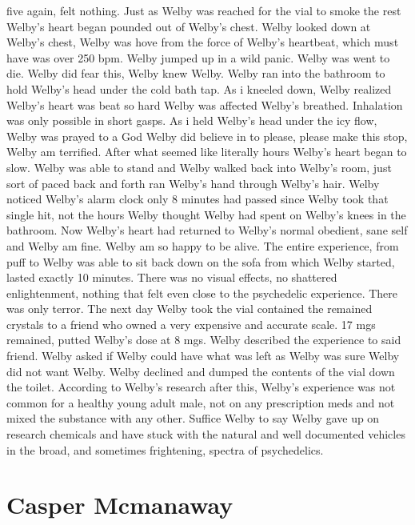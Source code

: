 \documentclass[12pt]{book}
\begin{document}
five again, felt nothing. Just as Welby was reached for the vial to smoke the rest Welby's heart began pounded out of Welby's chest. Welby looked down at Welby's chest, Welby was hove from the force of Welby's heartbeat, which must have was over 250 bpm. Welby jumped up in a wild panic. Welby was went to die. Welby did fear this, Welby knew Welby. Welby ran into the bathroom to hold Welby's head under the cold bath tap. As i kneeled down, Welby realized Welby's heart was beat so hard Welby was affected Welby's breathed. Inhalation was only possible in short gasps. As i held Welby's head under the icy flow, Welby was prayed to a God Welby did believe in to please, please make this stop, Welby am terrified. After what seemed like literally hours Welby's heart began to slow. Welby was able to stand and Welby walked back into Welby's room, just sort of paced back and forth ran Welby's hand through Welby's hair. Welby noticed Welby's alarm clock only 8 minutes had passed since Welby took that single hit, not the hours Welby thought Welby had spent on Welby's knees in the bathroom. Now Welby's heart had returned to Welby's normal obedient, sane self and Welby am fine. Welby am so happy to be alive. The entire experience, from puff to Welby was able to sit back down on the sofa from which Welby started, lasted exactly 10 minutes. There was no visual effects, no shattered enlightenment, nothing that felt even close to the psychedelic experience. There was only terror. The next day Welby took the vial contained the remained crystals to a friend who owned a very expensive and accurate scale. 17 mgs remained, putted Welby's dose at 8 mgs. Welby described the experience to said friend. Welby asked if Welby could have what was left as Welby was sure Welby did not want Welby. Welby declined and dumped the contents of the vial down the toilet. According to Welby's research after this, Welby's experience was not common for a healthy young adult male, not on any prescription meds and not mixed the substance with any other. Suffice Welby to say Welby gave up on research chemicals and have stuck with the natural and well documented vehicles in the broad, and sometimes frightening, spectra of psychedelics.



\chapter{Casper Mcmanaway}
\end{document}
